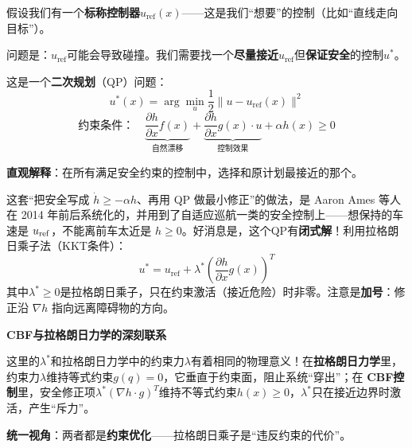 \begin{keyformula}[title=基于CBF的安全控制器]
假设我们有一个\textbf{标称控制器}$u_{\text{ref}}(x)$——这是我们“想要”的控制（比如“直线走向目标”）。

问题是：$u_{\text{ref}}$可能会导致碰撞。我们需要找一个\textbf{尽量接近}$u_{\text{ref}}$但\textbf{保证安全}的控制$u^*$。

这是一个\textbf{二次规划}（QP）问题：
\begin{equation}
    u^*(x) = \arg\min_{u} \frac{1}{2}\|u - u_{\text{ref}}(x)\|^2
\end{equation}
\begin{equation}
    \text{约束条件：} \quad \underbrace{\frac{\partial h}{\partial x}f(x)}_{\text{自然漂移}} + \underbrace{\frac{\partial h}{\partial x}g(x) \cdot u}_{\text{控制效果}} + \alpha h(x) \geq 0
\end{equation}

\textbf{直观解释}：在所有满足安全约束的控制中，选择和原计划最接近的那个。
\end{keyformula}

这套“把安全写成 $\dot h \ge -\alpha h$、再用 QP 做最小修正”的做法，是 Aaron Ames 等人在 2014 年前后系统化的，并用到了自适应巡航一类的安全控制上——想保持的车速是 $u_{\rm ref}$，不能离前车太近是 $h \ge 0$。好消息是，这个QP有\textbf{闭式解}！利用拉格朗日乘子法（KKT条件）：
\begin{equation}
    u^* = u_{\text{ref}} + \lambda^* \left(\frac{\partial h}{\partial x}g(x)\right)^T
\end{equation}
其中$\lambda^* \geq 0$是拉格朗日乘子，只在约束激活（接近危险）时非零。注意是\textbf{加号}：修正沿 $\nabla h$ 指向远离障碍物的方向。

\begin{physicalintuition}
\textbf{CBF与拉格朗日力学的深刻联系}

这里的$\lambda^*$和拉格朗日力学中的约束力$\lambda$有着相同的物理意义！在\textbf{拉格朗日力学}里，约束力$\lambda$维持等式约束$g(q) = 0$，它垂直于约束面，阻止系统“穿出”；在 \textbf{CBF控制}里，安全修正项$\lambda^* (\nabla h \cdot g)^T$维持不等式约束$h(x) \geq 0$，$\lambda^*$只在接近边界时激活，产生“斥力”。

\textbf{统一视角}：两者都是\textbf{约束优化}——拉格朗日乘子是“违反约束的代价”。
\end{physicalintuition}

